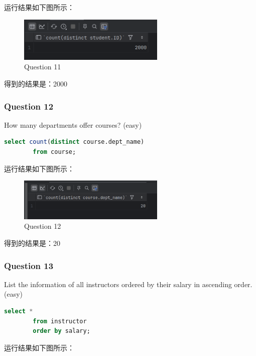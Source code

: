 \documentclass{article}
\begin{document}
    运行结果如下图所示：
    
    \begin{figure}[H]
    	\centering
    	\includegraphics[width=7cm]{./images/15.Question11-ans2.png}
    	\caption{Question 11}
    \end{figure}
    
    得到的结果是：2000
    
    \subsubsection{Question 12}
    
    How many departments offer courses?  (easy)
    
    \begin{lstlisting}[language=sql, title=Question 12, tabsize=4]
    	select count(distinct course.dept_name)
    	from course;
    \end{lstlisting}
    
    运行结果如下图所示：
    
    \begin{figure}[H]
    	\centering
    	\includegraphics[width=7cm]{./images/16.Question12.png}
    	\caption{Question 12}
    \end{figure}
    
    得到的结果是：20
    
    \subsubsection{Question 13}
    
    List the information of all instructors ordered by their salary in ascending order.  (easy)
    
    \begin{lstlisting}[language=sql, title=Question 13, tabsize=4]
    	select *
    	from instructor
    	order by salary;
    \end{lstlisting}
    
    运行结果如下图所示：
    
\end{document}
